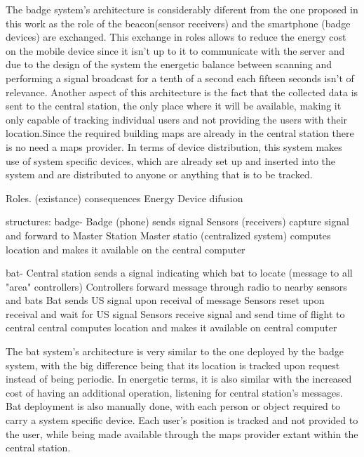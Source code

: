 	The badge system's architecture is considerably diferent from the one proposed in this work as the role of the beacon(sensor receivers) and the smartphone (badge devices) are exchanged. This exchange in roles allows to reduce the energy cost on the mobile device since it isn't up to it to communicate with the server and due to the design of the system the energetic balance between scanning and performing a signal broadcast for a tenth of a second each fifteen seconds isn't of relevance. Another aspect of this architecture is the fact that the collected data is sent to the central station, the only place where it will be available, making it only capable of tracking individual users and not providing the users with their location.Since the required building maps are already in the central station there is no need a maps provider. In terms of device distribution, this system makes use of system specific devices, which are already set up and inserted into the system and are distributed to anyone or anything that is to be tracked.

























Roles. (existance) consequences
Energy
Device difusion

structures:
badge-      Badge (phone) sends signal
			Sensors (receivers) capture signal and forward to Master Station
			Master statio (centralized system) computes location and makes it available on the central computer




bat- 		Central station sends a signal indicating which bat to locate (message to all "area" controllers)
			Controllers forward message through radio to nearby sensors and bats
			Bat sends US signal upon receival of message
			Sensors reset upon receival and wait for US signal
			Sensors receive signal and send time of flight to central
			central computes location and makes it available on central computer

The bat system's architecture is very similar to the one deployed by the badge system, with the big difference being that its location is tracked upon request instead of being periodic. In energetic terms, it is also similar with the increased cost of having an additional operation, listening for central station's messages. Bat deployment is also manually done, with each person or object required to carry a system specific device. Each user's position is tracked and not provided to the user, while being made available through the maps provider extant within the central station.


